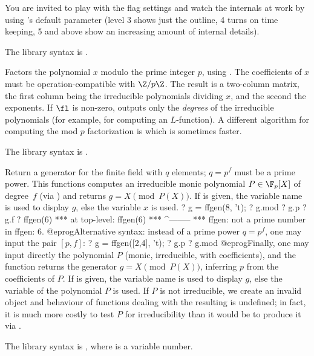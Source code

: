 You are invited to play with the flag settings and watch the internals at
work by using 's  default parameter (level 3 shows
just the outline, 4 turns on time keeping, 5 and above show an increasing
amount of internal details).

The library syntax is .

\label{se:factormod}
Factors the polynomial $x$ modulo the prime integer $p$, using
. The coefficients of $x$ must be operation-compatible with
$\Z/p\Z$. The result is a two-column matrix, the first column being the
irreducible polynomials dividing $x$, and the second the exponents. If $\fl$
is non-zero, outputs only the \emph{degrees} of the irreducible polynomials
(for example, for computing an $L$-function). A different algorithm for
computing the mod $p$ factorization is  which is sometimes
faster.

The library syntax is .

\label{se:ffgen}
Return a  generator for the finite field with $q$ elements;
$q = p^f$ must be a prime power. This functions computes an irreducible
monic polynomial $P\in\F_p[X]$ of degree~$f$ (via ) and
returns $g = X \pmod{P(X)}$. If  is given, the variable name is used
to display $g$, else the variable $x$ is used.
\bprog
? g = ffgen(8, 't);
? g.mod
? g.p
? g.f
? ffgen(6)
 ***   at top-level: ffgen(6)
 ***                 ^--------
 *** ffgen: not a prime number in ffgen: 6.
@eprog\noindent Alternative syntax: instead of a prime power $q=p^f$, one may
input the pair $[p,f]$:
\bprog
? g = ffgen([2,4], 't);
? g.p
? g.mod
@eprog\noindent Finally, one may input
directly the polynomial $P$ (monic, irreducible, with 
coefficients), and the function returns the generator $g = X \pmod{P(X)}$,
inferring $p$ from the coefficients of $P$. If  is given, the
variable name is used to display $g$, else the variable of the polynomial
$P$ is used. If $P$ is not irreducible, we create an invalid object and
behaviour of functions dealing with the resulting 
is undefined; in fact, it is much more costly to test $P$ for
irreducibility than it would be to produce it via .

The library syntax is , where  is a variable number.

